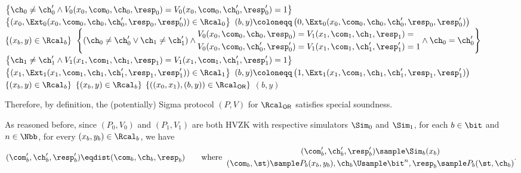 \begin{answer}
\begin{simplebox}
\begin{algorithmic}[1]
                \Statex\hspace*{\algorithmicindent} $\left\{\ch_0\neq \ch_0' \land V_0(x_0, \com_0, \ch_0, \resp_0)=V_0(x_0, \com_0, \ch_0', \resp_0')=1\right\}$  
                \Statex\hspace*{\algorithmicindent} $\left\{(x_0, \Ext_0(x_0, \com_0, \ch_0, \ch_0', \resp_0, \resp_0')) \in \Rcal_0\right\}$ 
                \State $(b, y)\coloneqq \left( 0, \Ext_0(x_0, \com_0, \ch_0, \ch_0', \resp_0, \resp_0') \right)$
                \Statex\hspace*{\algorithmicindent} $\left\{(x_b, y) \in \Rcal_b\right\}$
            \Else 
                \Statex\hspace*{\algorithmicindent} $\left\{(\ch_0\neq \ch_0' \lor \ch_1\neq \ch_1')\land  \begin{aligned} V_0(x_0, \com_0, \ch_0, \resp_0)&=V_1(x_1, \com_1, \ch_1, \resp_1)=\\ V_0(x_0, \com_0, \ch_0', \resp_0')&=V_1(x_1, \com_1, \ch_1', \resp_1') =1\end{aligned} \land \ch_0= \ch_0'\right\}$ 
                \Statex\hspace*{\algorithmicindent} $\left\{\ch_1\neq \ch_1' \land V_1(x_1, \com_1, \ch_1, \resp_1)=V_1(x_1, \com_1, \ch_1', \resp_1')=1\right\}$ 
                \Statex\hspace*{\algorithmicindent} $\left\{(x_1, \Ext_1(x_1, \com_1, \ch_1, \ch_1', \resp_1, \resp_1')) \in \Rcal_1\right\}$ 
                \State $(b, y)\coloneqq \left( 1,  \Ext_1(x_1, \com_1, \ch_1, \ch_1', \resp_1, \resp_1') \right)$
                \Statex\hspace*{\algorithmicindent} $\left\{(x_b, y) \in \Rcal_b\right\}$
            \EndIf
            \Statex $\left\{(x_b, y) \in \Rcal_b\right\}$
            \Statex $\left\{\left((x_0, x_1), (b, y)\right) \in \Rcal_\mathsf{OR}\right\}$ 
            \State\Return $(b,y)$
        \end{algorithmic}
    \end{simplebox}

    Therefore, by definition, the (potentially) Sigma protocol $(P, V)$ for $\Rcal_\mathsf{OR}$ satisfies special soundness.
    
    As reasoned before, since $(P_0, V_0)$ and $(P_1, V_1)$ are both HVZK with respective simulators $\Sim_0$ and $\Sim_1$, for each $b\in\bit$ and $n\in\Nbb$, for every $(x_b, y_b)\in \Rcal_b$, we have
    \begin{equation}\label{eq:p5-3-2}
        (\com_b', \ch_b', \resp_b') \eqdist (\com_b, \ch_b, \resp_b)
        \qquad
        \textrm{where}
        \;\;
        \begin{gathered}
            (\com_b', \ch_b', \resp_b')\sample \Sim_b(x_b) \\
             (\com_b, \st)\sample P_b(x_b, y_b), \ch_b \Usample \bit^n, \resp_b \sample  P_b(\st, \ch_b)
        \end{gathered}.
    \end{equation}


\end{answer}
